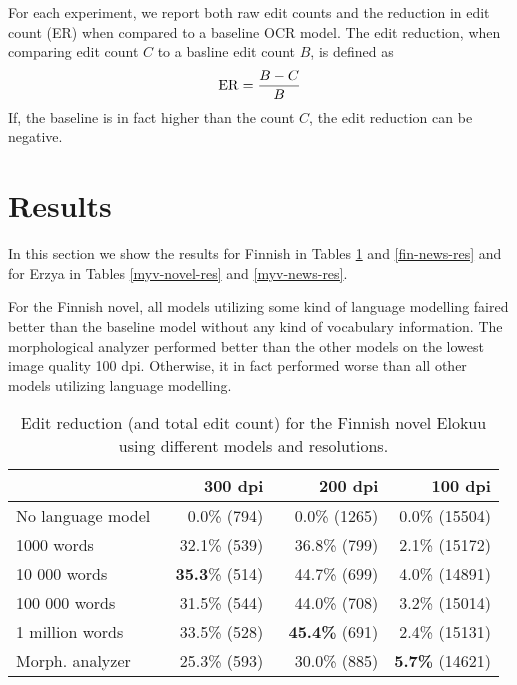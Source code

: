\documentclass[b5paper]{article}
\begin{document}
For each experiment, we report both raw edit counts and the reduction
in edit count (ER) when compared to a baseline OCR model. The edit
reduction, when comparing edit count $C$ to a basline edit count $B$,
is defined as
$${\rm ER} = \frac{B - C}{B}$$
If, the baseline is in fact higher than the count $C$, the edit
reduction can be negative.

\section{Results}

In this section we show the results for Finnish in Tables
\ref{fin-novel-res} and \ref{fin-news-res} and for Erzya in Tables
\ref{myv-novel-res} and \ref{myv-news-res}. 

For the Finnish novel, all models utilizing some kind of language
modelling faired better than the baseline model without any kind of
vocabulary information. The morphological analyzer performed better
than the other models on the lowest image quality 100 dpi. Otherwise,
it in fact performed worse than all other models utilizing language
modelling.

\begin{table}[!htb]
\begin{center}
\begin{tabular}{lrrr}
\hline 
                  & 300 dpi & 200 dpi & 100 dpi \\
\hline 
No language model & ~0.0\% (794)          & ~0.0\% (1265)          & 0.0\% (15504) \\
1000 words        & ~32.1\% (539)  & ~36.8\% (799)        & 2.1\% (15172)    \\
10 000 words      & {\bf ~35.3}\% (514)  & ~44.7\%  (699)  & 4.0\% (14891)   \\
100 000 words     & ~31.5\% (544)   & ~44.0\%  (708)  & 3.2\%  (15014)  \\
1 million words   & ~33.5\% (528)   & {\bf ~45.4\%} (691)  & 2.4\% (15131)        \\
Morph. analyzer   & ~25.3\% (593)    & ~30.0\% (885)     & {\bf 5.7\%} (14621)  \\
\hline 
\end{tabular}
\caption{Edit reduction (and total edit count) for the Finnish novel Elokuu using different models and resolutions.}\label{fin-novel-res}
\end{center}
\end{table}
\end{document}
